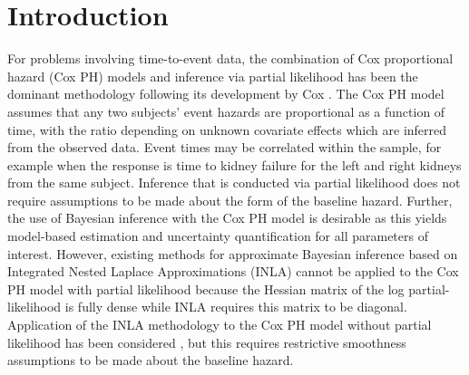 \documentclass[ba]{imsart}
\begin{document}




%


\section{Introduction}\label{sec1}
For problems involving time-to-event data, the combination of Cox proportional hazard (Cox PH) models and inference via partial likelihood has been the dominant methodology following its development by Cox \citep{coxph}. The Cox PH model assumes that any two subjects' event hazards are proportional as a function of time, with the ratio depending on unknown covariate effects which are inferred from the observed data. Event times may be correlated within the sample, for example when the response is time to kidney failure for the left and right kidneys from the same subject. Inference that is conducted via partial likelihood does not require assumptions to be made about the form of the baseline hazard. Further, the use of Bayesian inference with the Cox PH model is desirable as this yields model-based estimation and uncertainty quantification for all parameters of interest. However, existing methods for approximate Bayesian inference based on Integrated Nested Laplace Approximations (INLA) \citep{inla} cannot be applied to the Cox PH model with partial likelihood because the Hessian matrix of the log partial-likelihood is fully dense while INLA requires this matrix to be diagonal. Application of the INLA methodology to the Cox PH model without partial likelihood has been considered \citep{inlacoxph}, but this requires restrictive smoothness assumptions to be made about the baseline hazard.
\end{document}
